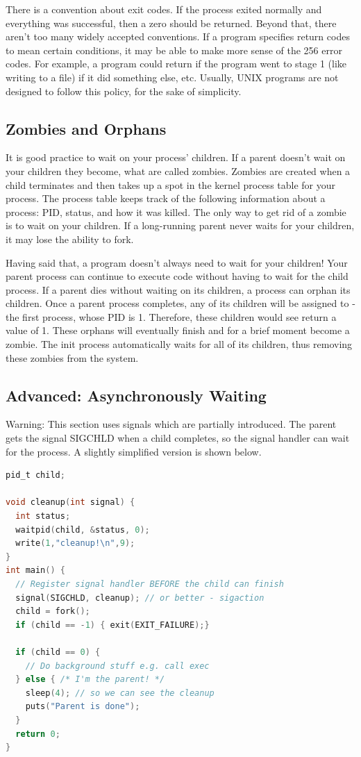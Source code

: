 There is a convention about exit codes.
If the process exited normally and everything was successful, then a zero should be returned.
Beyond that, there aren't too many widely accepted conventions.
If a program specifies return codes to mean certain conditions, it may be able to make more sense of the 256 error codes.
For example, a program could return  if the program went to stage 1 (like writing to a file)  if it did something else, etc.
Usually, UNIX programs are not designed to follow this policy, for the sake of simplicity.


\subsection{Zombies and Orphans}

It is good practice to wait on your process' children.
If a parent doesn't wait on your children they become, what are called zombies.
Zombies are created when a child terminates and then takes up a spot in the kernel process table for your process.
The process table keeps track of the following information about a process: PID, status, and how it was killed.
The only way to get rid of a zombie is to wait on your children.
If a long-running parent never waits for your children, it may lose the ability to fork.

Having said that, a program doesn't always need to wait for your children!
Your parent process can continue to execute code without having to wait for the child process.
If a parent dies without waiting on its children, a process can orphan its children.
Once a parent process completes, any of its children will be assigned to  - the first process, whose PID is 1.
Therefore, these children would see  return a value of 1.
These orphans will eventually finish and for a brief moment become a zombie.
The init process automatically waits for all of its children, thus removing these zombies from the system.

\subsection{Advanced: Asynchronously Waiting}

Warning: This section uses signals which are partially introduced.
The parent gets the signal SIGCHLD when a child completes, so the signal handler can wait for the process.
A slightly simplified version is shown below.

\begin{lstlisting}[language=C]
pid_t child;

void cleanup(int signal) {
  int status;
  waitpid(child, &status, 0);
  write(1,"cleanup!\n",9);
}
int main() {
  // Register signal handler BEFORE the child can finish
  signal(SIGCHLD, cleanup); // or better - sigaction
  child = fork();
  if (child == -1) { exit(EXIT_FAILURE);}

  if (child == 0) {
    // Do background stuff e.g. call exec
  } else { /* I'm the parent! */
    sleep(4); // so we can see the cleanup
    puts("Parent is done");
  }
  return 0;
}
\end{lstlisting}

